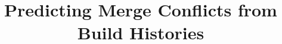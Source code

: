 \documentclass[10pt,conference]{IEEEtran}
\begin{document}
\title{Predicting Merge Conflicts from Build Histories}
\author{}
\maketitle


\end{document}
